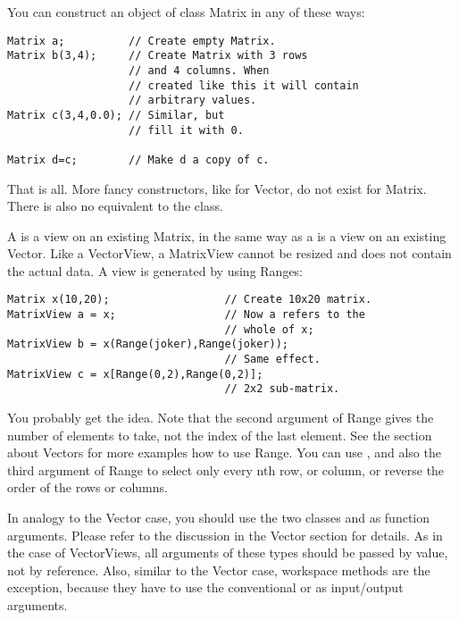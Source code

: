 You can construct an object of class Matrix in any of these ways:

\begin{verbatim}
Matrix a;          // Create empty Matrix.
Matrix b(3,4);     // Create Matrix with 3 rows 
                   // and 4 columns. When
                   // created like this it will contain
                   // arbitrary values.
Matrix c(3,4,0.0); // Similar, but
                   // fill it with 0.

Matrix d=c;        // Make d a copy of c.
\end{verbatim}

That is all. More fancy constructors, like for Vector, do not exist
for Matrix. There is also no equivalent to the 
class. 


A  is a view on an existing Matrix, in the same way
as a  is a view on an existing Vector. Like a
VectorView, a MatrixView cannot be resized and does not contain the
actual data. A view is generated by using Ranges:

\begin{verbatim}
Matrix x(10,20);                  // Create 10x20 matrix.
MatrixView a = x;                 // Now a refers to the 
                                  // whole of x;
MatrixView b = x(Range(joker),Range(joker));
                                  // Same effect.
MatrixView c = x[Range(0,2),Range(0,2)];
                                  // 2x2 sub-matrix.
\end{verbatim}

You probably get the idea. Note that the second argument of Range gives
the number of elements to take, not the index of the last element. See
the section about Vectors for more examples how to use Range. You can
use , and also the third argument of Range to select only
every nth row, or column, or reverse the order of the rows or columns. 

In analogy to the Vector case, you should use the two classes
 and  as function arguments.
Please refer to the discussion in the Vector section for details. As
in the case of VectorViews, all arguments of these types should be
passed by value, not by reference. Also, similar to the Vector case,
workspace methods are the exception, because they have to use the
conventional  or  as input/output
arguments.

